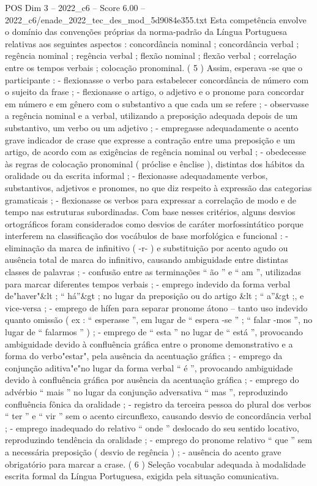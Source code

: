 \begin{textsample}{POS Dim 3 – 2022\_c6 – Score 6.00 – 2022\_c6/enade\_2022\_tec\_des\_mod\_5d9084e355.txt}
Esta competência envolve o domínio das convenções próprias da norma-padrão da Língua Portuguesa relativas aos seguintes aspectos : concordância nominal ; concordância verbal ; regência nominal ; regência verbal ; flexão nominal ; flexão verbal ; correlação entre os tempos verbais ; colocação pronominal. ( 5 ) Assim, esperava -se que o participante : - flexionasse o verbo para estabelecer concordância de número com o sujeito da frase ; - flexionasse o artigo, o adjetivo e o pronome para concordar em número e em gênero com o substantivo a que cada um se refere ; - observasse a regência nominal e a verbal, utilizando a preposição adequada depois de um substantivo, um verbo ou um adjetivo ; - empregasse adequadamente o acento grave indicador de crase que expresse a contração entre uma preposição e um artigo, de acordo com as exigências de regência nominal ou verbal ; - obedecesse às regras de colocação pronominal ( próclise e ênclise ), distintas dos hábitos da oralidade ou da escrita informal ; - flexionasse adequadamente verbos, substantivos, adjetivos e pronomes, no que diz respeito à expressão das categorias gramaticais ; - flexionasse os verbos para expressar a correlação de modo e de tempo nas estruturas subordinadas.
Com base nesses critérios, alguns desvios ortográficos foram considerados como desvios de caráter morfossintático porque interferem na classificação dos vocábulos de base morfológica e funcional : - eliminação da marca de infinitivo ( -r- ) e substituição por acento agudo ou ausência total de marca do infinitivo, causando ambiguidade entre distintas classes de palavras ; - confusão entre as terminações “ ão ” e “ am ”, utilizadas para marcar diferentes tempos verbais ; - emprego indevido da forma verbal de"haver"\&lt ; “ há”\&gt ; no lugar da preposição ou do artigo \&lt ; “ a”\&gt ;, e vice-versa ; - emprego de hífen para separar pronome átono – tanto uso indevido quanto omissão ( ex : “ esperasse ”, em lugar de “ espera -se ” ; “ falar -mos ”, no lugar de “ falarmos ” ) ; - emprego de “ esta ” no lugar de “ está ”, provocando ambiguidade devido à confluência gráfica entre o pronome demonstrativo e a forma do verbo"estar", pela ausência da acentuação gráfica ; - emprego da conjunção aditiva"e"no lugar da forma verbal “ é ”, provocando ambiguidade devido à confluência gráfica por ausência da acentuação gráfica ; - emprego do advérbio “ mais ” no lugar da conjunção adversativa “ mas ”, reproduzindo confluência fônica da oralidade ; - registro da terceira pessoa do plural dos verbos “ ter ” e “ vir ” sem o acento circunflexo, causando desvio de concordância verbal ; - emprego inadequado do relativo “ onde ” deslocado do seu sentido locativo, reproduzindo tendência da oralidade ; - emprego do pronome relativo “ que ” sem a necessária preposição ( desvio de regência ) ; - ausência do acento grave obrigatório para marcar a crase. ( 6 ) Seleção vocabular adequada à modalidade escrita formal da Língua Portuguesa, exigida pela situação comunicativa.

\end{textsample}
